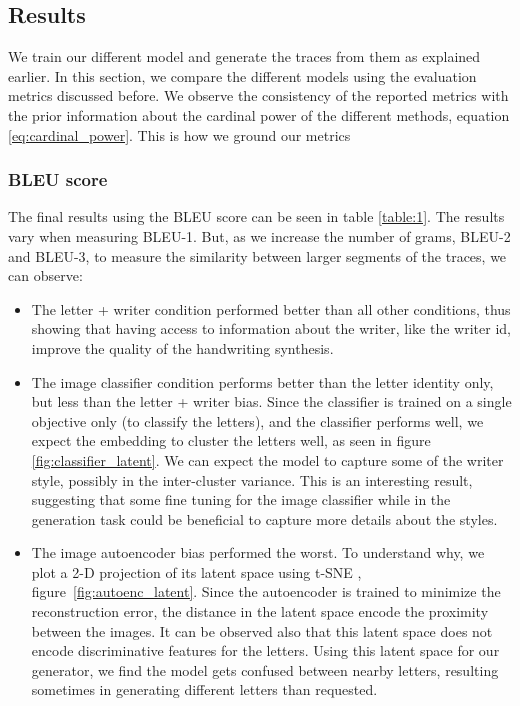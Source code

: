 \subsection{Results}
\par We train our different model and generate the traces from them as explained earlier. In this section, we compare the different models using the evaluation metrics discussed before. We  observe the consistency of the reported metrics with the prior information about the cardinal power of the different methods, equation \ref{eq:cardinal_power}. This is how we ground our metrics
\subsubsection{BLEU score}
\par The final results using the BLEU score can be seen in table \ref{table:1}. The results vary when measuring BLEU-1. But, as we increase the number of grams, BLEU-2 and BLEU-3, to measure the similarity between larger segments of the traces, we can observe:
\begin{itemize}
    \item The letter + writer condition performed better than all other conditions, thus showing that having access to information about the writer, like the writer id, improve the quality of the handwriting synthesis.
    \item The image classifier condition performs better than the letter identity only, but less than the letter + writer bias. Since the classifier is trained on a single objective only (to classify the letters), and the classifier performs well, we expect the embedding to cluster the letters well, as seen in figure \ref{fig:classifier_latent}. We can expect the model to capture some of the writer style, possibly in the inter-cluster variance. This is an interesting result, suggesting that some fine tuning for the image classifier while in the generation task could be beneficial to capture more details about the styles.
    \item The image autoencoder bias performed the worst. To understand why, we plot a 2-D projection of its latent space using t-SNE \citep{maaten2008visualizing}, figure~\ref{fig:autoenc_latent}. Since the autoencoder is trained to minimize the reconstruction error, the distance in the latent space encode the proximity between the images. It can be observed also that this latent space does not encode discriminative features for the letters. Using this latent space for our generator, we find the model gets confused between nearby letters, resulting sometimes in generating different letters than requested.
\end{itemize}


